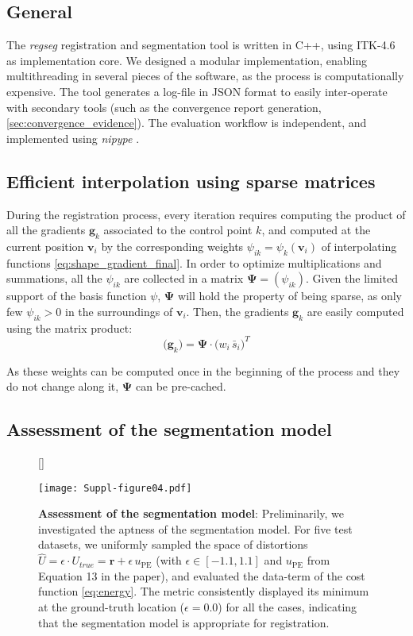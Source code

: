 \documentclass[a4paper]{report}
\renewcommand{\vec}[1]{\mathbf{#1}}
\begin{document}
\subsection{General} The \emph{regseg} registration and segmentation tool is written in C++, using ITK-4.6
  \citep{ibanez_itk_2005} as  implementation core.
We designed a modular implementation, enabling multithreading in several pieces of the software,
  as the process is computationally expensive.
The tool generates a log-file in JSON format to easily inter-operate with secondary tools (such
  as the convergence report generation, \autoref{sec:convergence_evidence}).
The evaluation workflow is independent, and implemented using \emph{nipype} \citep{gorgolewski_nipype_2011}.

\subsection{Efficient interpolation using sparse matrices}
During the registration process, every iteration requires computing the product of all the gradients
  $\vec{g}_k$ associated to the control point $k$, and computed at the current position
  $\vec{v}_i$ by the corresponding weights $\psi_{ik} = \psi_k(\mathbf{v}_i)$ of interpolating functions
  \eqref{eq:shape_gradient_final}.
In order to optimize multiplications and summations, all the $\psi_{ik}$ are collected in a
  matrix $\boldsymbol{\Psi} = (\psi_{ik})$.
Given the limited support of the basis function $\psi$, $\boldsymbol{\Psi}$ will hold the property
  of being sparse, as only few $\psi_{ik} > 0$ in the surroundings of $\vec{v}_i$.
Then, the gradients $\vec{g}_k$ are easily computed using the matrix product:
\begin{equation}
  \big(\vec{g}_k \big) = \boldsymbol{\Psi} \cdot \big( w_i \, \bar{s}_i \big)^T
  \label{eq:sparse_matrix}
\end{equation}

As these weights can be computed once in the beginning of the process and they do not change along
  it, $\boldsymbol{\Psi}$ can be pre-cached.

\subsection{Assessment of the segmentation model}
\begin{figure}[!ht]
  [\FBwidth]
  {\caption{\textbf{Assessment of the segmentation model}:
  Preliminarily, we investigated the aptness of the segmentation model.
  For five test datasets, we uniformly sampled the space of distortions
    $\hat{U} = \epsilon \cdot U_{true} = \vec{r} + \epsilon \, u_\text{PE}$
    (with $\epsilon \in [-1.1, 1.1]$ and $u_\text{PE}$ from Equation 13 in the
    paper), and evaluated the data-term of the cost function \eqref{eq:energy}.
  The metric consistently displayed its minimum at the ground-truth location ($\epsilon=0.0$)
    for all the cases, indicating that the segmentation model is appropriate for
    registration.}}
  {\texttt{[image: Suppl-figure04.pdf]}}
  \label{fig:energymap}
\end{figure}
\end{document}
